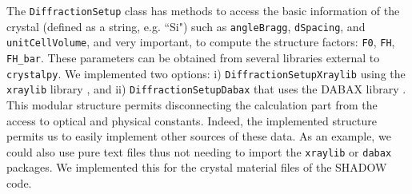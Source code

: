 \documentclass[preprint]{iucr}              %
\begin{document}
The {\tt DiffractionSetup} class has methods to access the basic information of the crystal (defined as a string, e.g. ``Si") such as {\tt angleBragg}, {\tt dSpacing}, and {\tt unitCellVolume}, and very important, to compute the structure factors: {\tt F0}, {\tt FH}, {\tt FH\_bar}. These parameters can be obtained from several libraries external to {\tt crystalpy}. We implemented two options: i) {\tt DiffractionSetupXraylib} using the {\tt xraylib} library \cite{xraylib}, and ii) {\tt DiffractionSetupDabax} that uses the DABAX library \cite{dabax}. This modular structure permits disconnecting the calculation part from the access to optical and physical constants. Indeed, the implemented structure permits us to easily implement other sources of these data. As an example, we could also use pure text files thus not needing to import the {\tt xraylib} or {\tt dabax} packages. We implemented this for the crystal material files of the SHADOW~\cite{codeSHADOW} code.



\end{document}
